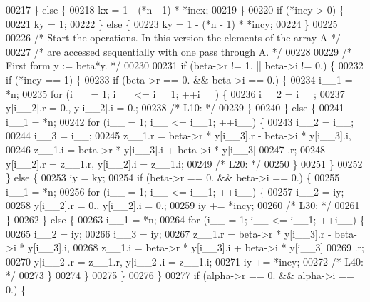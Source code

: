 \begin{DoxyCode}
00217     \} \textcolor{keywordflow}{else} \{
00218     kx = 1 - (*n - 1) * *incx;
00219     \}
00220     \textcolor{keywordflow}{if} (*incy > 0) \{
00221     ky = 1;
00222     \} \textcolor{keywordflow}{else} \{
00223     ky = 1 - (*n - 1) * *incy;
00224     \}
00225 
00226 \textcolor{comment}{/*     Start the operations. In this version the elements of the array A */}
00227 \textcolor{comment}{/*     are accessed sequentially with one pass through A. */}
00228 
00229 \textcolor{comment}{/*     First form  y := beta*y. */}
00230 
00231     \textcolor{keywordflow}{if} (beta->r != 1. || beta->i != 0.) \{
00232     \textcolor{keywordflow}{if} (*incy == 1) \{
00233         \textcolor{keywordflow}{if} (beta->r == 0. && beta->i == 0.) \{
00234         i\_\_1 = *n;
00235         \textcolor{keywordflow}{for} (i\_\_ = 1; i\_\_ <= i\_\_1; ++i\_\_) \{
00236             i\_\_2 = i\_\_;
00237             y[i\_\_2].r = 0., y[i\_\_2].i = 0.;
00238 \textcolor{comment}{/* L10: */}
00239         \}
00240         \} \textcolor{keywordflow}{else} \{
00241         i\_\_1 = *n;
00242         \textcolor{keywordflow}{for} (i\_\_ = 1; i\_\_ <= i\_\_1; ++i\_\_) \{
00243             i\_\_2 = i\_\_;
00244             i\_\_3 = i\_\_;
00245             z\_\_1.r = beta->r * y[i\_\_3].r - beta->i * y[i\_\_3].i, 
00246                 z\_\_1.i = beta->r * y[i\_\_3].i + beta->i * y[i\_\_3]
00247                 .r;
00248             y[i\_\_2].r = z\_\_1.r, y[i\_\_2].i = z\_\_1.i;
00249 \textcolor{comment}{/* L20: */}
00250         \}
00251         \}
00252     \} \textcolor{keywordflow}{else} \{
00253         iy = ky;
00254         \textcolor{keywordflow}{if} (beta->r == 0. && beta->i == 0.) \{
00255         i\_\_1 = *n;
00256         \textcolor{keywordflow}{for} (i\_\_ = 1; i\_\_ <= i\_\_1; ++i\_\_) \{
00257             i\_\_2 = iy;
00258             y[i\_\_2].r = 0., y[i\_\_2].i = 0.;
00259             iy += *incy;
00260 \textcolor{comment}{/* L30: */}
00261         \}
00262         \} \textcolor{keywordflow}{else} \{
00263         i\_\_1 = *n;
00264         \textcolor{keywordflow}{for} (i\_\_ = 1; i\_\_ <= i\_\_1; ++i\_\_) \{
00265             i\_\_2 = iy;
00266             i\_\_3 = iy;
00267             z\_\_1.r = beta->r * y[i\_\_3].r - beta->i * y[i\_\_3].i, 
00268                 z\_\_1.i = beta->r * y[i\_\_3].i + beta->i * y[i\_\_3]
00269                 .r;
00270             y[i\_\_2].r = z\_\_1.r, y[i\_\_2].i = z\_\_1.i;
00271             iy += *incy;
00272 \textcolor{comment}{/* L40: */}
00273         \}
00274         \}
00275     \}
00276     \}
00277     \textcolor{keywordflow}{if} (alpha->r == 0. && alpha->i == 0.) \{

\end{DoxyCode}
